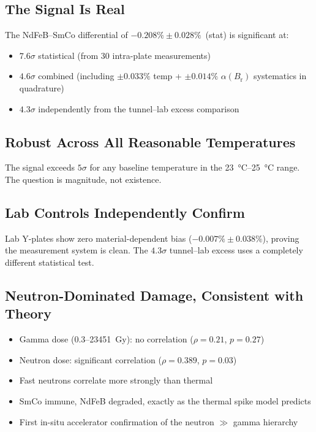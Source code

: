 \documentclass[11pt,letterpaper]{article}
\newcommand{\Br}{B_\mathrm{r}}
\newcommand{\alphar}{\alpha(\Br)}
\begin{document}
\subsection{The Signal Is Real}

The NdFeB--SmCo differential of $-0.208\% \pm 0.028\%$~(stat) is significant
at:
\begin{itemize}
    \item $7.6\sigma$ statistical (from 30 intra-plate measurements)
    \item $4.6\sigma$ combined (including $\pm 0.033\%$ temp +
    $\pm 0.014\%$ $\alphar$ systematics in quadrature)
    \item $4.3\sigma$ independently from the tunnel--lab excess
    comparison
\end{itemize}

\subsection{Robust Across All Reasonable Temperatures}

The signal exceeds $5\sigma$ for any baseline temperature in the
\SIrange{23}{25}{\celsius} range. The question is magnitude, not existence.

\subsection{Lab Controls Independently Confirm}

Lab Y-plates show zero material-dependent bias ($-0.007\% \pm 0.038\%$),
proving the measurement system is clean. The $4.3\sigma$ tunnel--lab excess
uses a completely different statistical test.

\subsection{Neutron-Dominated Damage, Consistent with Theory}

\begin{itemize}
    \item Gamma dose (0.3--\SI{23451}{Gy}): no correlation ($\rho = 0.21$,
    $p = 0.27$)
    \item Neutron dose: significant correlation ($\rho = 0.389$, $p = 0.03$)
    \item Fast neutrons correlate more strongly than thermal
    \item SmCo immune, NdFeB degraded, exactly as the thermal spike model
    predicts
    \item First in-situ accelerator confirmation of the neutron $\gg$ gamma
    hierarchy
\end{itemize}
\end{document}
